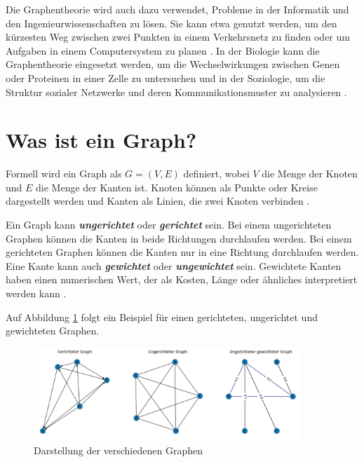 Die Graphentheorie wird auch dazu verwendet, Probleme in der Informatik und den Ingenieurwissenschaften zu lösen.
Sie kann etwa genutzt werden, um den kürzesten Weg zwischen zwei Punkten in einem Verkehrsnetz zu finden \cite[p.~269]{dijkstra_note_1959} oder um Aufgaben in einem Computersystem zu planen \cite[p.~9]{garey_computers_1990}.
In der Biologie kann die Graphentheorie eingesetzt werden, um die Wechselwirkungen zwischen Genen oder Proteinen in einer Zelle zu untersuchen \cite[p.~3]{albert_diameter_1999} und in der Soziologie, um die Struktur sozialer Netzwerke und deren Kommunikationsmuster zu analysieren \cite[p.~1ff.]{barnes_graph_1969}.

\section{Was ist ein Graph?}

Formell wird ein Graph als $G = (V, E)$ definiert, wobei $V$ die Menge der Knoten und $E$ die Menge der Kanten ist.
Knoten können als Punkte oder Kreise dargestellt werden und Kanten als Linien, die zwei Knoten verbinden \cite[p.~45]{barabasi_network_2016}.

Ein Graph kann \textbf{\textit{ungerichtet}} oder \textbf{\textit{gerichtet}} sein. Bei einem ungerichteten Graphen können die Kanten in beide Richtungen durchlaufen werden.
Bei einem gerichteten Graphen können die Kanten nur in eine Richtung durchlaufen werden.
Eine Kante kann auch \textbf{\textit{gewichtet}} oder \textbf{\textit{ungewichtet}} sein.
Gewichtete Kanten haben einen numerischen Wert, der als Kosten, Länge oder ähnliches interpretiert werden kann \cite[p.~46]{barabasi_network_2016}.

Auf Abbildung \ref{fig:general_graphs} folgt ein Beispiel für einen gerichteten, ungerichtet und gewichteten Graphen.

\begin{figure}[H]
    \centering
    \includegraphics[width=0.9\textwidth]{images/10_introduction/graph_intro.png}
    \caption{Darstellung der verschiedenen Graphen}
    \label{fig:general_graphs}
\end{figure}

